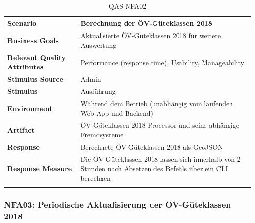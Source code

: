 \begin{longtable}{l p{10.6cm}}
        \toprule
        \textbf{Scenario}
                                & Berechnung der ÖV-Güteklassen 2018\\
        \midrule
        \textbf{Business Goals}
                                & Aktualisierte ÖV-Güteklassen 2018 für weitere Auswertung\\
        \textbf{Relevant Quality Attributes}
                                & Performance (response time), Usability, Manageability\\
        \textbf{Stimulus Source}
                                & Admin\\
        \textbf{Stimulus}
                                & Ausführung \nameref{Use Cases:UC01}\\
        \textbf{Environment}
                                & Während dem Betrieb (unabhängig vom laufenden Web-App und Backend)\\
        \textbf{Artifact}
                                & ÖV-Güteklassen 2018 Processor und seine abhängige Fremdsysteme\\
        \textbf{Response}
                                & Berechnete ÖV-Güteklassen 2018 als GeoJSON\\  
        \textbf{Response Measure}
                                & Die ÖV-Güteklassen 2018 lassen sich innerhalb von 2 Stunden nach Absetzen des Befehls über ein CLI berechnen\\                                
        \bottomrule
    \caption{QAS NFA02}
    \label{table:nfa02}
\end{longtable}

\subsubsection{NFA03: Periodische Aktualisierung der ÖV-Güteklassen 2018}
\label{NFA:NFA03}

